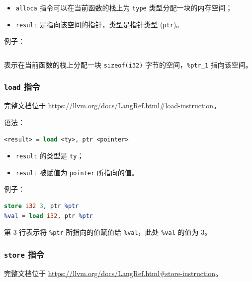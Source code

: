 \begin{itemize}
  \item \texttt{alloca} 指令可以在当前函数的栈上为 \texttt{type} 类型分配一块的内存空间；
  \item \texttt{result} 是指向该空间的指针，类型是指针类型 (\texttt{ptr})。
\end{itemize}

例子：
\begin{lstlisting}[language=llvm]
%ptr_1 = alloca i32
\end{lstlisting}
表示在当前函数的栈上分配一块 \texttt{sizeof(i32)} 字节的空间，\texttt{\%ptr\_1} 指向该空间。

\subsubsection{\texttt{load} 指令}\label{LLVM-load-instructions}

\begin{remark}
完整文档位于 \url{https://llvm.org/docs/LangRef.html\#load-instruction}。
\end{remark}

语法：
\begin{lstlisting}[language=llvm]
<result> = load <ty>, ptr <pointer>
\end{lstlisting}

\begin{itemize}
  \item \texttt{result} 的类型是 \texttt{ty}；
  \item \texttt{result} 被赋值为 \texttt{pointer} 所指向的值。
\end{itemize}

例子：
\begin{lstlisting}[language=llvm]
%ptr = alloca i32
store i32 3, ptr %ptr
%val = load i32, ptr %ptr
\end{lstlisting}

第 3 行表示将 \texttt{\%ptr} 所指向的值赋值给 \texttt{\%val}，此处 \texttt{\%val}
的值为 3。

\subsubsection{\texttt{store} 指令}\label{LLVM-store-instructions}

\begin{remark}
完整文档位于 \url{https://llvm.org/docs/LangRef.html\#store-instruction}。
\end{remark}

